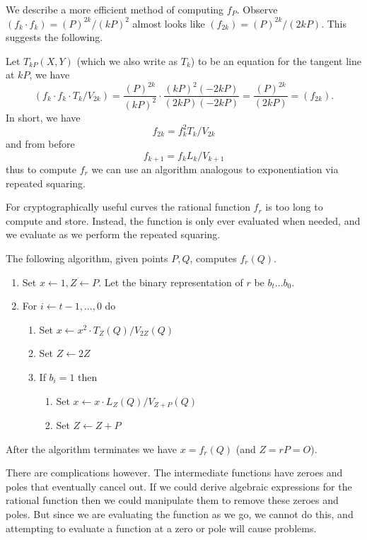 We describe a more efficient method of computing $f_P$.
Observe $(f_k \cdot f_k) = {(P)^{2k}}/{(kP)^2}$
almost looks like $(f_{2k}) = {(P)^{2k}}/{(2kP)}$.
This suggests the following.

Let $T_{kP}(X,Y)$ (which we also write as $T_k$)
to be an equation for the tangent line at $kP$,
we have
\[
(f_k \cdot f_k \cdot T_k / V_{2k} ) = \frac{(P)^{2k}}{(kP)^2} \cdot
\frac{(kP)^2 (-2kP)}{(2kP)(-2kP)} = \frac{(P)^{2k}}{(2kP)} = (f_{2k}) .
\]
In short, we have
\[
f_{2k} = f_k^2 T_k / V_{2k}
\]
and from before
\[
f_{k+1} = f_k L_{k} / V_{k+1}
\]
thus to compute $f_r$ we can use an algorithm analogous to exponentiation via
repeated squaring.

For cryptographically useful curves the rational function $f_r$
is too long to compute and store. Instead, the function is only ever
evaluated when needed, and we evaluate as we perform the repeated
squaring.

The following algorithm, given points $P, Q$, computes
$f_r(Q)$.

\begin{enumerate}
\item
Set $x \leftarrow 1, Z \leftarrow P$.
Let the binary representation of $r$ be $b_t ... b_0$.
\item
For $i \leftarrow t-1, ..., 0$ do
    \begin{enumerate}
    \item
    Set $x \leftarrow x^2 \cdot T_Z(Q) / V_{2Z}(Q)$
    \item
    Set $Z \leftarrow 2Z$
    \item
    If $b_i = 1$ then
	\begin{enumerate}
	\item
	Set $x \leftarrow x \cdot L_{Z}(Q) / V_{Z+P}(Q)$
	\item
	Set $Z \leftarrow Z + P$
	\end{enumerate}
    \end{enumerate}
\end{enumerate}

After the algorithm terminates we have $x = f_r(Q)$ (and $Z = rP = O$).

There are complications however. The intermediate functions have zeroes
and poles that eventually cancel out. If we could derive algebraic expressions
for the rational function then we could manipulate them to remove these
zeroes and poles. But since we are evaluating the function as we go,
we cannot do this, and attempting to evaluate a function at a zero
or pole will cause problems.

